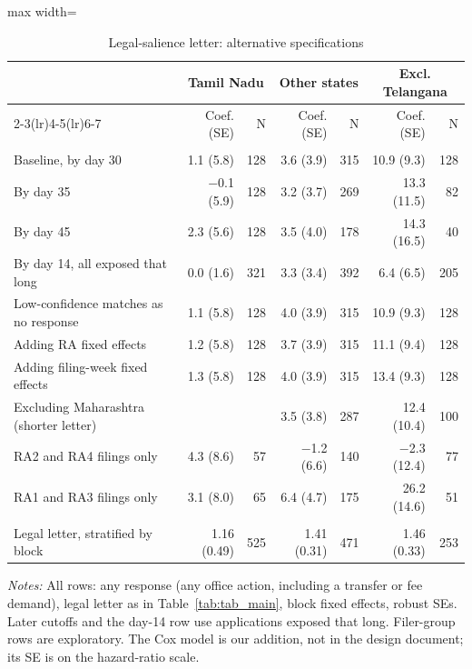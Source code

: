 \begin{table}[!htbp]
\centering
\caption{Legal-salience letter: alternative specifications}
\label{tab:tab_robust}
\footnotesize
\begin{adjustbox}{max width=\textwidth}
\begin{threeparttable}
\begin{tabular}{lrrrrrr}
\toprule
& \multicolumn{2}{c}{Tamil Nadu} & \multicolumn{2}{c}{Other states} & \multicolumn{2}{c}{Excl. Telangana} \\ \cmidrule(lr){2-3}\cmidrule(lr){4-5}\cmidrule(lr){6-7}  & Coef. (SE) & N & Coef. (SE) & N & Coef. (SE) & N \\
\midrule
\addlinespace\multicolumn{7}{l}{\textit{Linear probability, any response (percentage points)}} \\
Baseline, by day 30 & 1.1 (5.8) & 128 & 3.6 (3.9) & 315 & 10.9 (9.3) & 128 \\
By day 35 & $-$0.1 (5.9) & 128 & 3.2 (3.7) & 269 & 13.3 (11.5) & 82 \\
By day 45 & 2.3 (5.6) & 128 & 3.5 (4.0) & 178 & 14.3 (16.5) & 40 \\
By day 14, all exposed that long & 0.0 (1.6) & 321 & 3.3 (3.4) & 392 & 6.4 (6.5) & 205 \\
Low-confidence matches as no response & 1.1 (5.8) & 128 & 4.0 (3.9) & 315 & 10.9 (9.3) & 128 \\
Adding RA fixed effects & 1.2 (5.8) & 128 & 3.7 (3.9) & 315 & 11.1 (9.4) & 128 \\
Adding filing-week fixed effects & 1.3 (5.8) & 128 & 4.0 (3.9) & 315 & 13.4 (9.3) & 128 \\
Excluding Maharashtra (shorter letter) &  &  & 3.5 (3.8) & 287 & 12.4 (10.4) & 100 \\
RA2 and RA4 filings only & 4.3 (8.6) & 57 & $-$1.2 (6.6) & 140 & $-$2.3 (12.4) & 77 \\
RA1 and RA3 filings only & 3.1 (8.0) & 65 & 6.4 (4.7) & 175 & 26.2 (14.6) & 51 \\
\addlinespace\multicolumn{7}{l}{\textit{Cox model, all filings (hazard ratio)}} \\
Legal letter, stratified by block & 1.16 (0.49) & 525 & 1.41 (0.31) & 471 & 1.46 (0.33) & 253 \\
\bottomrule
\end{tabular}
\begin{tablenotes}[flushleft]\footnotesize
\item \textit{Notes:} All rows: any response (any office action, including a transfer or fee demand), legal letter as in Table~\ref{tab:tab_main}, block fixed effects, robust SEs. Later cutoffs and the day-14 row use applications exposed that long. Filer-group rows are exploratory. The Cox model is our addition, not in the design document; its SE is on the hazard-ratio scale.
\end{tablenotes}
\end{threeparttable}
\end{adjustbox}
\end{table}
